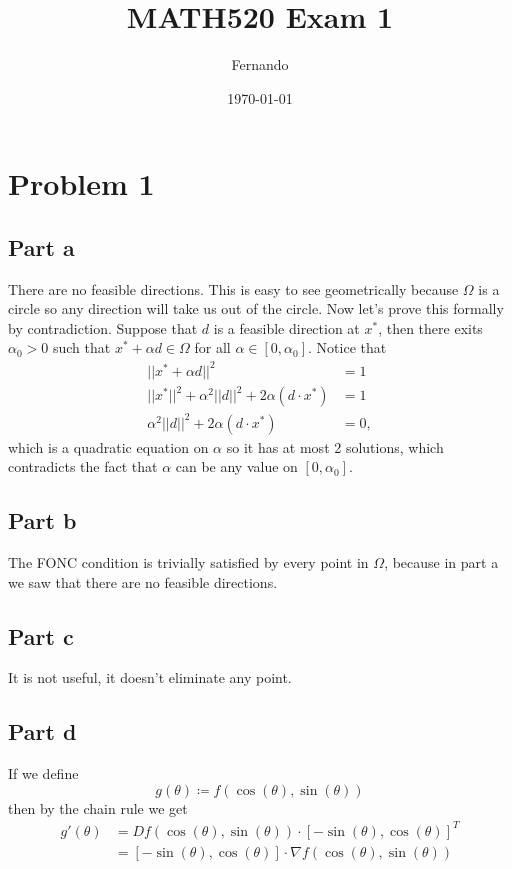 \documentclass{article}
\begin{document}
\title{MATH520 Exam 1}
\author{Fernando}
\date{\today}
\maketitle

\section*{Problem 1}
\subsection*{Part a}
There are no feasible directions. This is easy to see geometrically because
$\Omega$ is a circle so any direction will take us out of the circle. Now let's
prove this formally by contradiction. Suppose that $d$ is a feasible direction
at $x^*$, then there exits $\alpha_0>0$ such that $x^*+\alpha d\in\Omega$ for
all $\alpha \in [0,\alpha_0]$. Notice that
\begin{align*}
||x^*+\alpha d||^2&=1\\
||x^*||^2+\alpha^2||d||^2+2\alpha (d\cdot x^*)&=1\\
\alpha^2||d||^2+2\alpha (d\cdot x^*)&=0,
\end{align*}
which is a quadratic equation on $\alpha$ so it has at most 2 solutions, which
contradicts the fact that $\alpha$ can be any value on $[0,\alpha_0]$.
\subsection*{Part b}
The FONC condition is trivially satisfied by every point in $\Omega$, because
in part a we saw that there are no feasible directions.
\subsection*{Part c}
It is not useful, it doesn't eliminate any point.
\subsection*{Part d}
If we define
\[
g(\theta)\coloneq f(\cos(\theta),\sin(\theta))
\]
then by the chain rule we get
\begin{align*}
g'(\theta)
&=Df(\cos(\theta),\sin(\theta))\cdot
[-\sin(\theta),\cos(\theta)]^T\\
&=[-\sin(\theta),\cos(\theta)]\cdot
\nabla f(\cos(\theta),\sin(\theta))
\end{align*}
\end{document}
